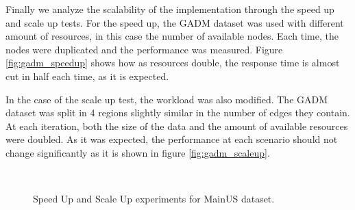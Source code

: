 Finally we analyze the scalability of the implementation through the speed up and scale up tests.  For the speed up, the GADM dataset was used with different amount of resources, in this case the number of available nodes.  Each time, the nodes were duplicated and the performance was measured.  Figure \ref{fig:gadm_speedup} shows  how as resources double, the response time is almost cut in half each time, as it is expected.

In the case of the scale up test, the workload was also modified.  The GADM dataset was split in 4 regions slightly similar in the number of edges they contain.  At each iteration, both the size of the data and the amount of available resources were doubled. As it was expected, the performance at each scenario should not change significantly as it is shown in figure \ref{fig:gadm_scaleup}.

\begin{figure}[!ht]
    \centering
     \\
    \caption{Speed Up and Scale Up experiments for MainUS dataset.} \label{fig:mainus_speed_scale}
\end{figure}

